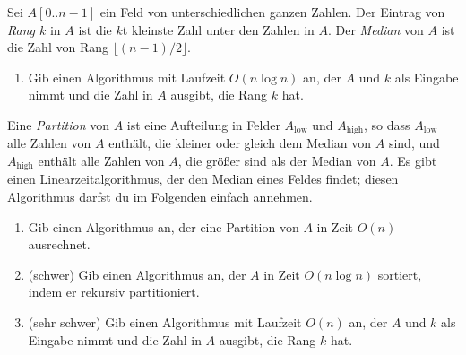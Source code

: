 \documentclass{uebung_cs}
\begin{document}
\begin{aufgabe}
Sei $A[0..n-1]$ ein Feld von unterschiedlichen ganzen Zahlen.
Der Eintrag von \emph{Rang $k$} in $A$ ist die $k$t kleinste Zahl unter den Zahlen in $A$.
Der \emph{Median} von $A$ ist die Zahl von Rang $\lfloor(n-1)/2\rfloor$.
\begin{enumerate}
	\item Gib einen Algorithmus mit Laufzeit $O(n\log n)$ an, der $A$ und $k$ als Eingabe nimmt und die Zahl in $A$ ausgibt, die Rang $k$ hat.
\end{enumerate}
Eine \emph{Partition} von $A$ ist eine Aufteilung in Felder $A_\text{low}$ und $A_\text{high}$, so dass $A_\text{low}$ alle Zahlen von $A$ enthält, die kleiner oder gleich dem Median von $A$ sind, und $A_\text{high}$ enthält alle Zahlen von $A$, die größer sind als der Median von $A$.
Es gibt einen Linearzeitalgorithmus, der den Median eines Feldes findet; diesen Algorithmus darfst du im Folgenden einfach annehmen.
\begin{enumerate}[resume]
	\item Gib einen Algorithmus an, der eine Partition von $A$ in Zeit $O(n)$ ausrechnet.
	\item (schwer) Gib einen Algorithmus an, der $A$ in Zeit $O(n\log n)$ sortiert, indem er rekursiv partitioniert.
	\item (sehr schwer) Gib einen Algorithmus mit Laufzeit $O(n)$ an, der $A$ und $k$ als Eingabe nimmt und die Zahl in $A$ ausgibt, die Rang $k$ hat.
\end{enumerate}
\end{aufgabe}
\end{document}
